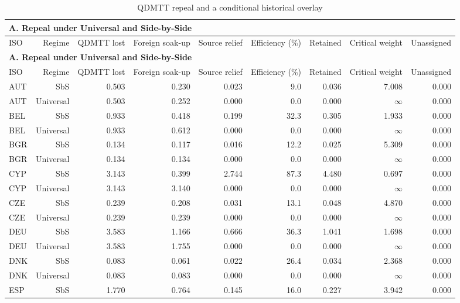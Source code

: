 {\small\setlength{\LTpre}{4pt}\setlength{\LTpost}{4pt}
\begin{longtable}{@{}lrrrrrrrr@{}}
\caption{QDMTT repeal and a conditional historical overlay}\label{tab:tab_v2_qdmtt_nash_deviation_game} \\
\multicolumn{9}{l}{\textbf{A. Repeal under Universal and Side-by-Side}} \\
\toprule
ISO & Regime & QDMTT lost & Foreign soak-up & Source relief & Efficiency (\%) & Retained & Critical weight & Unassigned \\
\midrule
\endfirsthead
\multicolumn{9}{l}{\textbf{A. Repeal under Universal and Side-by-Side}} \\
\toprule
ISO & Regime & QDMTT lost & Foreign soak-up & Source relief & Efficiency (\%) & Retained & Critical weight & Unassigned \\
\midrule
\endhead
\midrule
\endfoot
\bottomrule
\endlastfoot
AUT & SbS & 0.503 & 0.230 & 0.023 &  9.0 & 0.036 & 7.008 & 0.000 \\
AUT & Universal & 0.503 & 0.252 & 0.000 &  0.0 & 0.000 & $\infty$ & 0.000 \\
BEL & SbS & 0.933 & 0.418 & 0.199 & 32.3 & 0.305 & 1.933 & 0.000 \\
BEL & Universal & 0.933 & 0.612 & 0.000 &  0.0 & 0.000 & $\infty$ & 0.000 \\
BGR & SbS & 0.134 & 0.117 & 0.016 & 12.2 & 0.025 & 5.309 & 0.000 \\
BGR & Universal & 0.134 & 0.134 & 0.000 &  0.0 & 0.000 & $\infty$ & 0.000 \\
CYP & SbS & 3.143 & 0.399 & 2.744 & 87.3 & 4.480 & 0.697 & 0.000 \\
CYP & Universal & 3.143 & 3.140 & 0.000 &  0.0 & 0.000 & $\infty$ & 0.000 \\
CZE & SbS & 0.239 & 0.208 & 0.031 & 13.1 & 0.048 & 4.870 & 0.000 \\
CZE & Universal & 0.239 & 0.239 & 0.000 &  0.0 & 0.000 & $\infty$ & 0.000 \\
DEU & SbS & 3.583 & 1.166 & 0.666 & 36.3 & 1.041 & 1.698 & 0.000 \\
DEU & Universal & 3.583 & 1.755 & 0.000 &  0.0 & 0.000 & $\infty$ & 0.000 \\
DNK & SbS & 0.083 & 0.061 & 0.022 & 26.4 & 0.034 & 2.368 & 0.000 \\
DNK & Universal & 0.083 & 0.083 & 0.000 &  0.0 & 0.000 & $\infty$ & 0.000 \\
ESP & SbS & 1.770 & 0.764 & 0.145 & 16.0 & 0.227 & 3.942 & 0.000 \\

\end{longtable}}
